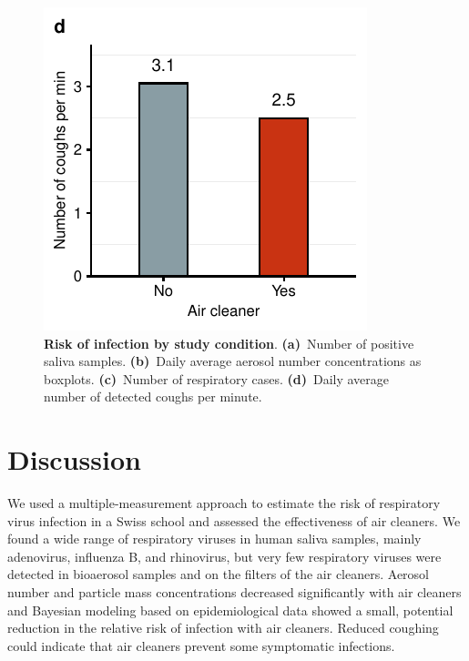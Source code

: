 \documentclass[fleqn,11pt]{wlscirep}
\begin{document}
\begin{figure}[!htpb]
    \includegraphics{../../results/cough-data/coughs-frequency-by-condition.pdf}
    \caption{\textbf{Risk of infection by study condition}. \textbf{(a)}~Number of positive saliva samples. \textbf{(b)}~Daily average aerosol number concentrations as boxplots. \textbf{(c)}~Number of respiratory cases. \textbf{(d)}~Daily average number of detected coughs per minute.}
    \label{fig:infection-risk}
\end{figure}

\FloatBarrier

\newpage

\section{Discussion}


We used a multiple-measurement approach to estimate the risk of respiratory virus infection in a Swiss school and assessed the effectiveness of air cleaners. We found a wide range of respiratory viruses in human saliva samples, mainly adenovirus, influenza B, and rhinovirus, but very few respiratory viruses were detected in bioaerosol samples and on the filters of the air cleaners. Aerosol number and particle mass concentrations decreased significantly with air cleaners and Bayesian modeling based on epidemiological data showed a small, potential reduction in the relative risk of infection with air cleaners. Reduced coughing could indicate that air cleaners prevent some symptomatic infections.

\end{document}
